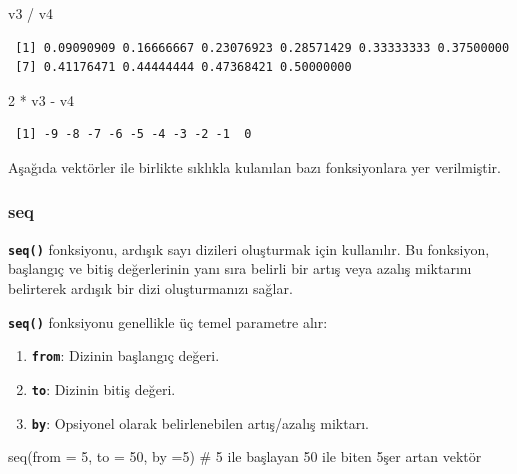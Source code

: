 \documentclass[
  letterpaper,
  DIV=11,
  numbers=noendperiod]{scrreprt}
\newenvironment{Shaded}{\begin{snugshade}}{\end{snugshade}}
\newcommand{\AttributeTok}[1]{\textcolor[rgb]{0.40,0.45,0.13}{#1}}
\newcommand{\CommentTok}[1]{\textcolor[rgb]{0.37,0.37,0.37}{#1}}
\newcommand{\DecValTok}[1]{\textcolor[rgb]{0.68,0.00,0.00}{#1}}
\newcommand{\FunctionTok}[1]{\textcolor[rgb]{0.28,0.35,0.67}{#1}}
\newcommand{\NormalTok}[1]{\textcolor[rgb]{0.00,0.23,0.31}{#1}}
\newcommand{\SpecialCharTok}[1]{\textcolor[rgb]{0.37,0.37,0.37}{#1}}
\begin{document}
\begin{Shaded}
\begin{Highlighting}[]
\NormalTok{v3 }\SpecialCharTok{/}\NormalTok{ v4}
\end{Highlighting}
\end{Shaded}

\begin{verbatim}
 [1] 0.09090909 0.16666667 0.23076923 0.28571429 0.33333333 0.37500000
 [7] 0.41176471 0.44444444 0.47368421 0.50000000
\end{verbatim}

\begin{Shaded}
\begin{Highlighting}[]
\DecValTok{2} \SpecialCharTok{*}\NormalTok{ v3 }\SpecialCharTok{{-}}\NormalTok{ v4}
\end{Highlighting}
\end{Shaded}

\begin{verbatim}
 [1] -9 -8 -7 -6 -5 -4 -3 -2 -1  0
\end{verbatim}

Aşağıda vektörler ile birlikte sıklıkla kulanılan bazı fonksiyonlara yer
verilmiştir.

\subsubsection{\texorpdfstring{\textbf{seq}}{seq}}\label{seq}

\textbf{\texttt{seq()}} fonksiyonu, ardışık sayı dizileri oluşturmak
için kullanılır. Bu fonksiyon, başlangıç ve bitiş değerlerinin yanı sıra
belirli bir artış veya azalış miktarını belirterek ardışık bir dizi
oluşturmanızı sağlar.

\textbf{\texttt{seq()}} fonksiyonu genellikle üç temel parametre alır:

\begin{enumerate}
\def\labelenumi{\arabic{enumi}.}
\item
  \textbf{\texttt{from}}: Dizinin başlangıç değeri.
\item
  \textbf{\texttt{to}}: Dizinin bitiş değeri.
\item
  \textbf{\texttt{by}}: Opsiyonel olarak belirlenebilen artış/azalış
  miktarı.
\end{enumerate}

\begin{Shaded}
\begin{Highlighting}[]
\FunctionTok{seq}\NormalTok{(}\AttributeTok{from =} \DecValTok{5}\NormalTok{, }\AttributeTok{to =} \DecValTok{50}\NormalTok{, }\AttributeTok{by =}\DecValTok{5}\NormalTok{) }\CommentTok{\# 5 ile başlayan 50 ile biten 5şer artan vektör}
\end{Highlighting}
\end{Shaded}
\end{document}
